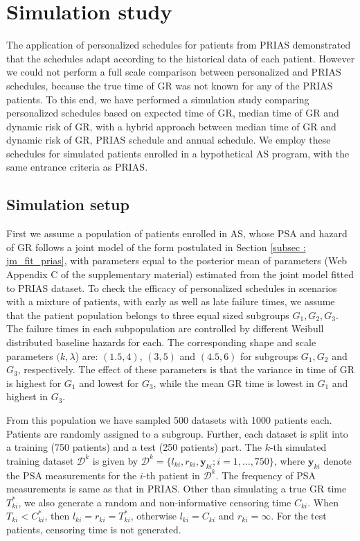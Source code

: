 
\section{Simulation study}
\label{sec: simulation_study}
The application of personalized schedules for patients from PRIAS demonstrated that the schedules adapt according to the historical data of each patient. However we could not perform a full scale comparison between personalized and PRIAS schedules, because the true time of GR was not known for any of the PRIAS patients. To this end, we have performed a simulation study comparing personalized schedules based on expected time of GR, median time of GR and dynamic risk of GR, with a hybrid approach between median time of GR and dynamic risk of GR, PRIAS schedule and annual schedule. We employ these schedules for simulated patients enrolled in a hypothetical AS program, with the same entrance criteria as PRIAS.

\subsection{Simulation setup}
\label{subsec : simulation_setup}
First we assume a population of patients enrolled in AS, whose PSA and hazard of GR follows a joint model of the form postulated in Section \ref{subsec : jm_fit_prias}, with parameters equal to the posterior mean of parameters (Web Appendix C of the supplementary material) estimated from the joint model fitted to PRIAS dataset. To check the efficacy of personalized schedules in scenarios with a mixture of patients, with early as well as late failure times, we assume that the patient population belongs to three equal sized subgroups $G_1, G_2, G_3$. The failure times in each subpopulation are controlled by different Weibull distributed baseline hazards for each. The corresponding shape and scale parameters $(k, \lambda$) are: $(1.5, 4)$, $(3, 5)$ and $(4.5, 6)$ for subgroups $G_1, G_2$ and $G_3$, respectively. The effect of these parameters is that the variance in time of GR is highest for $G_1$ and lowest for $G_3$, while the mean GR time is lowest in $G_1$ and highest in $G_3$.

From this population we have sampled 500 datasets with 1000 patients each. Patients are randomly assigned to a subgroup. Further, each dataset is split into a training (750 patients) and a test (250 patients) part. The $k$-th simulated training dataset $\mathcal{D}^k$ is given by $\mathcal{D}^k = \{l_{ki}, r_{ki}, \boldsymbol{y}_{ki}; i = 1, \ldots, 750\}$, where $\boldsymbol{y}_{ki}$ denote the PSA measurements for the $i$-th patient in $\mathcal{D}^k$. The frequency of PSA measurements is same as that in PRIAS. Other than simulating a true GR time $T^*_{ki}$, we also generate a random and non-informative censoring time $C_{ki}$. When $T_{ki} < C^*_{ki}$, then $l_{ki} = r_{ki} = T^*_{ki}$, otherwise $l_{ki} = C_{ki}$ and $r_{ki} = \infty$. For the test patients, censoring time is not generated.

